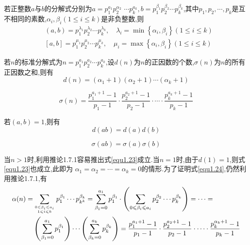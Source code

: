 \corollary {\color{red}[推论1.7.2]}若正整数$a$与$b$的分解式分别为$a=p_{1}^{a_{1}} p_{2}^{\alpha_{2}} $ $\cdots p_{k}^{a_{k}}, b=p_{1}^{\beta_{1}} p_{2}^{\beta_{2}} \cdots p_{k}^{\beta_{k}}$,其中$p_{1}, p_{2}, \cdots, p_{k}$是互不相同的素数,$\alpha_{i}, \beta_{i}(1 \leqslant i \leqslant k)$是非负整数,则
\begin{equation*}
	\begin{split}
		&(a, b)=p_{1}^{\lambda_{1}} p_{2}^{\lambda_{2}} \cdots p_{k}^{\lambda_{k}}, \quad \lambda_{i}=\min \left\{\alpha_{i}, \beta_{i}\right\}  (1 \leqslant i \leqslant k) \\
		&{[a, b]=p_{1}^{\mu_{1}} p_{2}^{\mu_{2}} \cdots p_{k}^{\mu_{k}}, \quad \mu_{i}=\max \left\{\alpha_{i}, \beta_{i}\right\}}  (1 \leqslant i \leqslant k)
	\end{split}
\end{equation*}

\example 若$n$的标准分解式为$n=p_{1}^{a_{1}} p_{2}^{a_{2}} \cdots p_{k}^{a_{k}}$,设$d(n)$为$n$的正因数的个数,$\sigma(n)$为$n$的所有正因数之和,则有
\begin{equation}\label{equ1.23}
	d(n)=\left(\alpha_{1}+1\right)\left(\alpha_{2}+1\right) \cdots\left(\alpha_{k}+1\right)
\end{equation}

\begin{equation}\label{equ1.24}
	\sigma(n)=\frac{p_{1}^{a_{1}+1}-1}{p_{1}-1} \cdot \frac{p_{2}^{a_{2}+1}-1}{p_{2}-1} \cdot \cdots \cdot \frac{p_{k}^{a_{k}+1}-1}{p_{k}-1}
\end{equation}

若$(a, b)=1$,则有
\begin{equation}\label{equ1.25}
	d(a b)=d(a) d(b)
\end{equation}

\begin{equation}\label{equ1.26}
	\sigma(a b)=\sigma(a) \sigma(b)
\end{equation}

\proof 当$n>1$时,利用推论1.7.1容易推出式\eqref{equ1.23}成立.当$n=1$时,由于$d(1)=1$,则式\eqref{equ1.23}也成立,此即为 $\alpha_{1}=\alpha_{2}=\cdots=\alpha_{k}=0$的情形.为了证明式\eqref{equ1.24},仍然利用推论1.7.1,有
\begin{equation*}
	\begin{aligned}
		\alpha(n)=& \sum_{0 \leqslant \beta_{i} \leqslant a_{i} \atop 1 \leqslant i \leqslant k} p_{1}^{\beta_{1}} \cdots p_{k^{k}}^{\beta_{k}}=\sum_{\beta_{1}=0}^{a_{1}} p_{1}^{\beta_{1}} \cdot\left(\sum_{0 \leqslant \beta_{i} \leqslant a_{i}} p_{2}^{\beta_{2}} \cdots p_{k}^{\beta_{k}}\right)=\cdots=\\
		&\left(\sum_{\beta_{1}=0}^{a_{1}} p_{1}^{\beta_{1}}\right) \cdots\left(\sum_{\beta_{k}=0}^{a_{k}} p_{k}^{\beta_{k}}\right)=\frac{p_{1}^{a_{1}+1}-1}{p_{1}-1} \cdot \frac{p_{2}^{a_{2}+1}-1}{p_{2}-1} \cdot \cdots \cdot \frac{p_{k}^{\alpha_{k}+1}-1}{p_{k}-1}
	\end{aligned}
\end{equation*}


